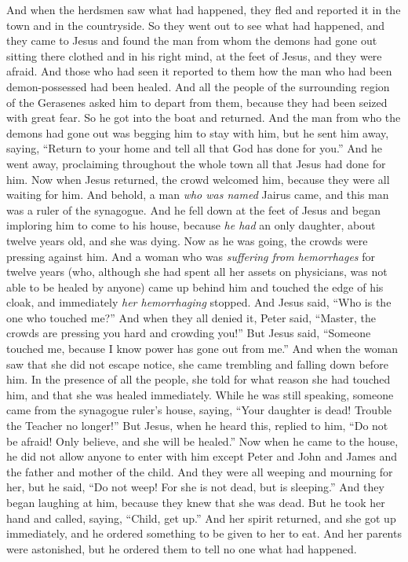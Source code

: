 \begin{biblechapter}
\verse And when the herdsmen saw what had happened, they fled and reported it in the town and in the countryside.
\verse So they went out to see what had happened, and they came to Jesus and found the man from whom the demons had gone out sitting there clothed and in his right mind, at the feet of Jesus, and they were afraid.
\verse And those who had seen it reported to them how the man who had been demon-possessed had been healed.
\verse And all the people of the surrounding region of the Gerasenes asked him to depart from them, because they had been seized with great fear. So he got into the boat and returned.
\verse And the man from who the demons had gone out was begging him to stay with him, but he sent him away, saying,
\verse “Return to your home and tell all that God has done for you.” And he went away, proclaiming throughout the whole town all that Jesus had done for him.
 Now when Jesus returned, the crowd welcomed him, because they were all waiting for him.
\verse And behold, a man \textit{who was named} Jairus came, and this man was a ruler of the synagogue. And he fell down at the feet of Jesus and began imploring him to come to his house,
\verse because \textit{he had} an only daughter, about twelve years old, and she was dying.
\verse Now as he was going, the crowds were pressing against him.
\verse And a woman who was \textit{suffering from hemorrhages} for twelve years (who, although she had spent all her assets on physicians, was not able to be healed by anyone)
\verse came up behind him and touched the edge of his cloak, and immediately \textit{her hemorrhaging} stopped.
\verse And Jesus said, “Who is the one who touched me?” And when they all denied it, Peter said, “Master, the crowds are pressing you hard and crowding you!”
\verse But Jesus said, “Someone touched me, because I know power has gone out from me.”
\verse And when the woman saw that she did not escape notice, she came trembling and falling down before him. In the presence of all the people, she told for what reason she had touched him, and that she was healed immediately.
\verse While he was still speaking, someone came from the synagogue ruler’s house, saying, “Your daughter is dead! Trouble the Teacher no longer!”
\verse But Jesus, when he heard this, replied to him, “Do not be afraid! Only believe, and she will be healed.”
\verse Now when he came to the house, he did not allow anyone to enter with him except Peter and John and James and the father and mother of the child.
\verse And they were all weeping and mourning for her, but he said, “Do not weep! For she is not dead, but is sleeping.”
\verse And they began laughing at him, because they knew that she was dead.
\verse But he took her hand and called, saying, “Child, get up.”
\verse And her spirit returned, and she got up immediately, and he ordered something to be given to her to eat.
\verse And her parents were astonished, but he ordered them to tell no one what had happened.
\end{biblechapter}

